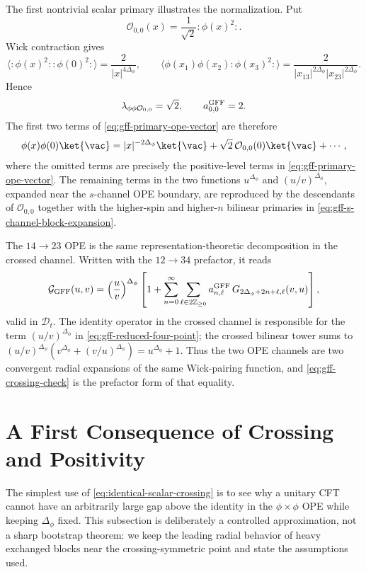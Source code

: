 The first nontrivial scalar primary illustrates the normalization.  Put
\[
  \mathcal O_{0,0}(x)=\frac{1}{\sqrt2}:\phi(x)^2: .
\]
Wick contraction gives
\[
  \langle :\phi(x)^2::\phi(0)^2:\rangle
  =
  \frac{2}{|x|^{4\Delta_\phi}},
  \qquad
  \langle \phi(x_1)\phi(x_2):\phi(x_3)^2:\rangle
  =
  \frac{2}{|x_{13}|^{2\Delta_\phi}|x_{23}|^{2\Delta_\phi}} .
\]
Hence
\begin{equation}
  \lambda_{\phi\phi\mathcal O_{0,0}}=\sqrt2,
  \qquad
  a^{\rm GFF}_{0,0}=2 .
  \label{eq:gff-leading-scalar-coefficient}
\end{equation}
The first two terms of \eqref{eq:gff-primary-ope-vector} are therefore
\[
  \phi(x)\phi(0)\ket{\vac}
  =
  |x|^{-2\Delta_\phi}\ket{\vac}
  +\sqrt2\,\mathcal O_{0,0}(0)\ket{\vac}
  +\cdots ,
\]
where the omitted terms are precisely the positive-level terms in
\eqref{eq:gff-primary-ope-vector}.
The remaining terms in the two functions
\(u^{\Delta_\phi}\) and \((u/v)^{\Delta_\phi}\), expanded near the
\(s\)-channel OPE boundary, are reproduced by the descendants of
\(\mathcal O_{0,0}\) together with the higher-spin and higher-\(n\) bilinear
primaries in \eqref{eq:gff-s-channel-block-expansion}.

The \(14\to23\) OPE is the same representation-theoretic decomposition in the
crossed channel.  Written with the \(12\to34\) prefactor, it reads
\begin{equation}
  \mathcal G_{\rm GFF}(u,v)
  =
  \left(\frac{u}{v}\right)^{\Delta_\phi}
  \left[
    1+
    \sum_{n=0}^{\infty}
    \sum_{\ell\in2\mathbb Z_{\ge0}}
    a^{\rm GFF}_{n,\ell}\,
    G_{2\Delta_\phi+2n+\ell,\ell}(v,u)
  \right],
  \label{eq:gff-t-channel-block-expansion}
\end{equation}
valid in \(\mathcal D_t\).  The identity operator in the crossed channel is
responsible for the term \((u/v)^{\Delta_\phi}\) in
\eqref{eq:gff-reduced-four-point}; the crossed bilinear tower sums to
\((u/v)^{\Delta_\phi}(v^{\Delta_\phi}+(v/u)^{\Delta_\phi})
=u^{\Delta_\phi}+1\).  Thus the two OPE channels are two convergent radial
expansions of the same Wick-pairing function, and
\eqref{eq:gff-crossing-check} is the prefactor form of that equality.

\section{A First Consequence of Crossing and Positivity}

The simplest use of \eqref{eq:identical-scalar-crossing} is to see why a
unitary CFT cannot have an arbitrarily large gap above the identity in the
\(\phi\times\phi\) OPE while keeping \(\Delta_\phi\) fixed.  This subsection
is deliberately a controlled approximation, not a sharp bootstrap theorem:
we keep the leading radial behavior of heavy exchanged blocks near the
crossing-symmetric point and state the assumptions used.

